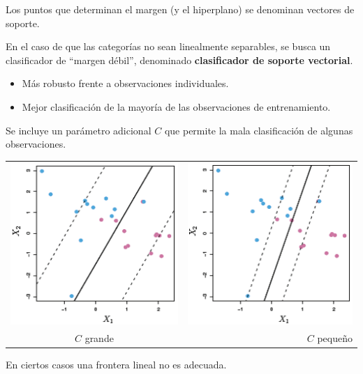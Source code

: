 \documentclass[]{book}
\begin{document}
Los puntos que determinan el margen (y el hiperplano) se denominan
vectores de soporte.

En el caso de que las categorías no sean linealmente separables, se
busca un clasificador de ``margen débil'', denominado \textbf{clasificador
de soporte vectorial}.

\begin{itemize}
\item
  Más robusto frente a observaciones individuales.
\item
  Mejor clasificación de la mayoría de las observaciones de
  entrenamiento.
\end{itemize}

Se incluye un parámetro adicional \(C\) que permite la mala
clasificación de algunas observaciones.

\begin{longtable}[]{@{}cr@{}}
\toprule
\endhead
\includegraphics{images/svm2.png} & \includegraphics{images/svm3.png}\tabularnewline
\(C\) grande & \(C\) pequeño\tabularnewline
\bottomrule
\end{longtable}

En ciertos casos una frontera lineal no es adecuada.
\end{document}
